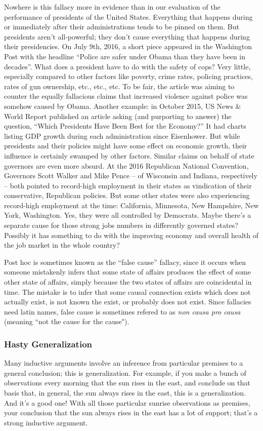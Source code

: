 Nowhere is this fallacy more in evidence than in our evaluation of the performance of presidents
of the United States. Everything that happens during or immediately after their administrations
tends to be pinned on them. But presidents aren't all-powerful; they don't cause everything that
happens during their presidencies. On July 9th, 2016, a short piece appeared in the Washington
Post with the headline ``Police are safer under Obama than they have been in decades''. What does
a president have to do with the safety of cops? Very little, especially compared to other factors like
poverty, crime rates, policing practices, rates of gun ownership, etc., etc., etc. To be fair, the article
was aiming to counter the equally fallacious claims that increased violence against police was
somehow caused by Obama. Another example: in October 2015, US News \& World Report
published an article asking (and purporting to answer) the question, ``Which Presidents Have Been
Best for the Economy?'' It had charts listing GDP growth during each administration since
Eisenhower. But while presidents and their policies might have some effect on economic growth,
their influence is certainly swamped by other factors. Similar claims on behalf of state governors
are even more absurd. At the 2016 Republican National Convention, Governors Scott Walker and
Mike Pence -- of Wisconsin and Indiana, respectively -- both pointed to record-high employment
in their states as vindication of their conservative, Republican policies. But some other states were
also experiencing record-high employment at the time: California, Minnesota, New Hampshire,
New York, Washington. Yes, they were all controlled by Democrats. Maybe there's a separate
cause for those strong jobs numbers in differently governed states? Possibly it has something to
do with the improving economy and overall health of the job market in the whole country?

Post hoc is sometimes known as the ``false cause'' fallacy, since it occurs when someone mistakenly infers that 
some state of affairs produces the effect of some other state of affairs, simply because the two states 
of affairs are coincidental in time. The mistake is to infer that some causal connection exists which does not 
actually exist, is not known the exist, or probably does not exist. Since fallacies need latin names, 
false cause is sometimes refered to as \emph{non causa pro causa} (meaning ``not the cause for the cause").

\subsubsection{Hasty Generalization}
Many inductive arguments involve an inference from particular premises to a general conclusion;
this is generalization. For example, if you make a bunch of observations every morning that the
sun rises in the east, and conclude on that basis that, in general, the sun always rises in the east,
this is a generalization. And it's a good one! With all those particular sunrise observations as
premises, your conclusion that the sun always rises in the east has a lot of support; that's a strong
inductive argument.

